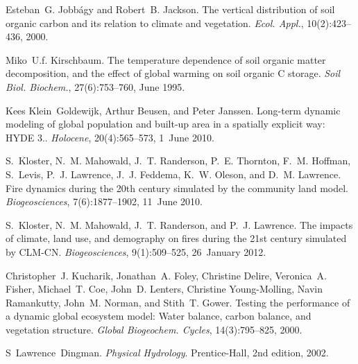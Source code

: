 \begin{DoxyDescription}
\item[\label{_CITEREF_Jobbagy2000-pa}%
\mbox{[}42\mbox{]}]Esteban~G. Jobbágy and Robert~B. Jackson. The vertical distribution of soil organic carbon and its relation to climate and vegetation. {\itshape Ecol. Appl.}, 10(2)\+:423--436, 2000. 


\item[\label{_CITEREF_Kirschbaum1995-db}%
\mbox{[}43\mbox{]}]Miko~U.\+f. Kirschbaum. The temperature dependence of soil organic matter decomposition, and the effect of global warming on soil organic C storage. {\itshape Soil Biol. Biochem.}, 27(6)\+:753--760, June 1995. 


\item[\label{_CITEREF_Klein_Goldewijk2010-lh}%
\mbox{[}44\mbox{]}]Kees Klein~Goldewijk, Arthur Beusen, and Peter Janssen. Long-\/term dynamic modeling of global population and built-\/up area in a spatially explicit way\+: H\+Y\+D\+E 3.. {\itshape Holocene}, 20(4)\+:565--573, 1~June 2010. 


\item[\label{_CITEREF_Kloster2010-633}%
\mbox{[}45\mbox{]}]S.~Kloster, N.~M. Mahowald, J.~T. Randerson, P.~E. Thornton, F.~M. Hoffman, S.~Levis, P.~J. Lawrence, J.~J. Feddema, K.~W. Oleson, and D.~M. Lawrence. Fire dynamics during the 20th century simulated by the community land model. {\itshape Biogeosciences}, 7(6)\+:1877--1902, 11~June 2010. 


\item[\label{_CITEREF_Kloster2012-c79}%
\mbox{[}46\mbox{]}]S.~Kloster, N.~M. Mahowald, J.~T. Randerson, and P.~J. Lawrence. The impacts of climate, land use, and demography on fires during the 21st century simulated by C\+L\+M-\/\+C\+N. {\itshape Biogeosciences}, 9(1)\+:509--525, 26~January 2012. 


\item[\label{_CITEREF_Kucharik2000-xk}%
\mbox{[}47\mbox{]}]Christopher~J. Kucharik, Jonathan~A. Foley, Christine Delire, Veronica~A. Fisher, Michael~T. Coe, John~D. Lenters, Christine Young-\/\+Molling, Navin Ramankutty, John~M. Norman, and Stith~T. Gower. Testing the performance of a dynamic global ecosystem model\+: Water balance, carbon balance, and vegetation structure. {\itshape Global Biogeochem. Cycles}, 14(3)\+:795--825, 2000. 


\item[\label{_CITEREF_Lawrence_Dingman2002-sq}%
\mbox{[}48\mbox{]}]S~Lawrence~Dingman. {\itshape Physical Hydrology}. Prentice-\/\+Hall, 2nd edition, 2002.



\end{DoxyDescription}
